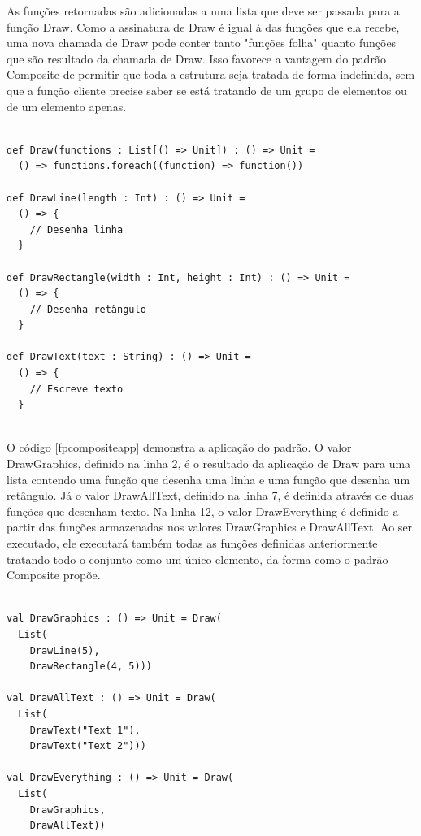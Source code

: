 As funções retornadas são adicionadas a uma 
lista que deve ser passada para a função Draw. 
Como a assinatura de Draw é igual à das funções 
que ela recebe, uma nova chamada de Draw pode 
conter tanto "funções folha" quanto funções 
que são resultado da chamada de Draw. Isso 
favorece a vantagem do padrão Composite de 
permitir que toda a estrutura seja tratada 
de forma indefinida, sem que a função 
cliente precise saber se está tratando de um 
grupo de elementos ou de um elemento apenas. 

\begin{lstlisting}[caption={Composite Funcional},label=fpcomposite]
    
def Draw(functions : List[() => Unit]) : () => Unit =
  () => functions.foreach((function) => function())

def DrawLine(length : Int) : () => Unit =
  () => {
    // Desenha linha
  }

def DrawRectangle(width : Int, height : Int) : () => Unit =
  () => {
    // Desenha retângulo
  }

def DrawText(text : String) : () => Unit =
  () => {
    // Escreve texto
  }
    
\end{lstlisting}

O código \ref{fpcompositeapp} demonstra a 
aplicação do padrão. O valor DrawGraphics, 
definido na linha 2, é o resultado da aplicação 
de Draw para uma lista contendo uma função que 
desenha uma linha e uma função que desenha 
um retângulo. Já o valor DrawAllText, definido 
na linha 7, é definida através de duas funções 
que desenham texto. Na linha 12, o valor 
DrawEverything é definido a partir das funções 
armazenadas nos valores DrawGraphics e 
DrawAllText. Ao ser executado, ele executará 
também todas as funções definidas anteriormente 
tratando todo o conjunto como um único elemento, 
da forma como o padrão Composite propõe.

\begin{lstlisting}[caption={Aplicação do Composite Funcional},label=fpcompositeapp]
    
val DrawGraphics : () => Unit = Draw(
  List(
    DrawLine(5),
    DrawRectangle(4, 5)))

val DrawAllText : () => Unit = Draw(
  List(
    DrawText("Text 1"),
    DrawText("Text 2")))

val DrawEverything : () => Unit = Draw(
  List(
    DrawGraphics,
    DrawAllText))
    
\end{lstlisting}
